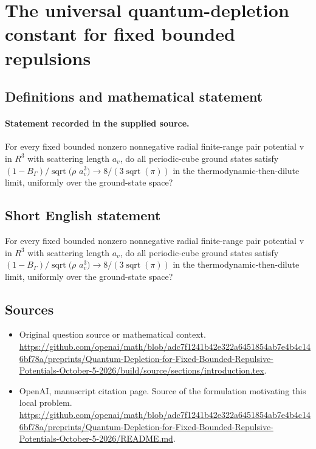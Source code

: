 \documentclass[11pt]{article}
\begin{document}
\section*{The universal quantum-depletion constant for fixed bounded repulsions}\label{statement}
\subsection{Definitions and mathematical statement}
\paragraph{Statement recorded in the supplied source.}
For every fixed bounded nonzero nonnegative radial finite-range pair potential v in $R^3$ with scattering length $a_v$, do all periodic-cube ground states satisfy $(1-B_\Gamma )/\operatorname{sqrt}(\rho $ $a_v^3)\to 8/(3\operatorname{sqrt}(\pi ))$ in the thermodynamic-then-dilute limit, uniformly over the ground-state space?
\subsection{Short English statement}
For every fixed bounded nonzero nonnegative radial finite-range pair potential v in $R^3$ with scattering length $a_v$, do all periodic-cube ground states satisfy $(1-B_\Gamma )/\operatorname{sqrt}(\rho $ $a_v^3)\to 8/(3\operatorname{sqrt}(\pi ))$ in the thermodynamic-then-dilute limit, uniformly over the ground-state space?
\subsection{Sources}
\begin{itemize}
\item[S1] Original question source or mathematical context.
\url{https://github.com/openai/math/blob/adc7f1241b42e322a6451854ab7e4b4c146bf78a/preprints/Quantum-Depletion-for-Fixed-Bounded-Repulsive-Potentials-October-5-2026/build/source/sections/introduction.tex}.
\item[S2] OpenAI, manuscript citation page. Source of the formulation motivating this local problem.
\url{https://github.com/openai/math/blob/adc7f1241b42e322a6451854ab7e4b4c146bf78a/preprints/Quantum-Depletion-for-Fixed-Bounded-Repulsive-Potentials-October-5-2026/README.md}.
\end{itemize}
\end{document}
